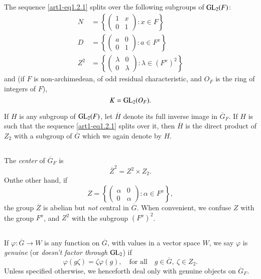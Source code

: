 \subsection{}\label{art1-sec1.3}
The sequence \eqref{art1-eq1.2.1} splits over the following subgroups of $\mathrm{GL}_{2}(F)$:
\begin{align*}
N &= \left\{ \left(\begin{matrix} 1 & x\\ 0 & 1\end{matrix}\right):x\in F\right\}\\[4pt]
D &= \left\{ \left(\begin{matrix} a & 0\\ 0 & 1\end{matrix}\right):a\in F^{x}\right\}\\[4pt]
Z^{2} &= \left\{ \left(\begin{matrix} \lambda & 0\\ 0 & \lambda\end{matrix}\right):\lambda\in (F^{x})^{2}\right\}
\end{align*}
and (if $F$ is non-archimedean, of odd residual characteristic, and $O_{F}$ is the ring of integers of $F$),
$$
K=\mathrm{GL}_{2}(O_{F}).
$$

If $H$ is any subgroup of $\mathrm{GL}_{2}(F)$, let $\overline{H}$ denote its full inverse image in $\overline{G}_{F}$. If $H$ is such that the sequence \eqref{art1-eq1.2.1} splits over it, then $\overline{H}$ is the direct product of $Z_{2}$ with a subgroup of $\overline{G}$ which we again denote by $H$.

\subsection{}\label{art1-sec1.4}
The {\em center} of $\overline{G}_{F}$ is
$$
\overline{Z}^{2}=Z^{2}\times Z_{2}.
$$
\eject
\noindent
On\pageoriginale the other hand, if
$$
Z=\left\{\left(\begin{matrix} \alpha & 0\\ 0 & \alpha\end{matrix}\right):\alpha\in F^{x}\right\},
$$
the group $\overline{Z}$ is abelian but {\em not} central in $\overline{G}$. When convenient, we confuse $Z$ with the group $F^{x}$, and $Z^{2}$ with the subgroup $(F^{x})^{2}$.

\subsection{}\label{art1-sec1.5}
If $\varphi : \overline{G}\to W$ is any function on $\overline{G}$, with values in a vector space $W$, we say $\varphi$ is {\em genuine} (or {\em doesn't factor through} $\mathrm{GL}_{2}$) if 
$$
\varphi(g\zeta)=\zeta\varphi(g),\quad\text{for all}\quad g\in \overline{G}, \ \zeta\in Z_{2}.
$$
Unless specified otherwise, we henceforth deal only with genuine objects on $\overline{G}_{F}$.

